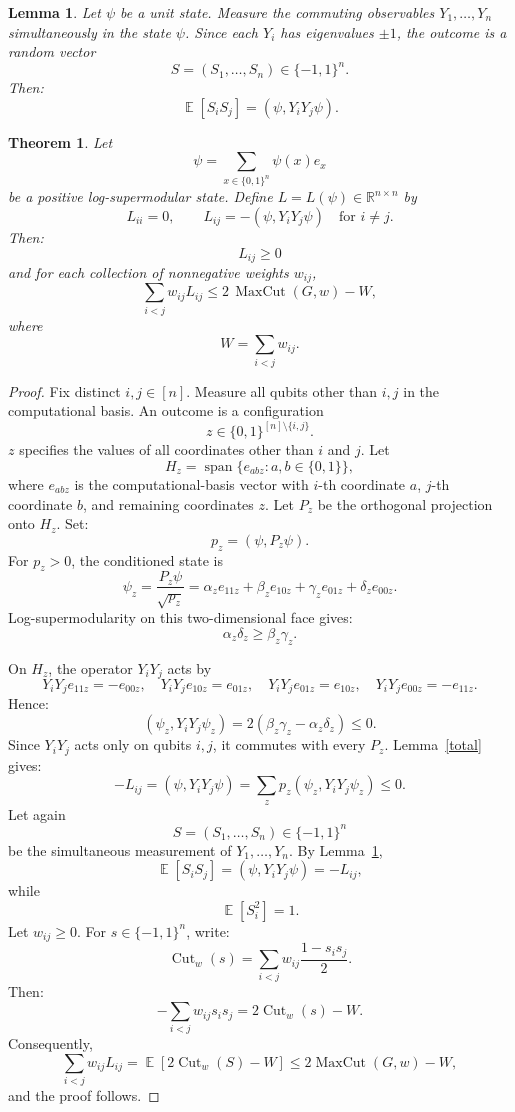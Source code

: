 \documentclass[10pt,a4paper]{amsart}
\newtheorem{lemma}{Lemma}
\newtheorem{theorem}{Theorem}
\DeclareMathOperator{\E}{\mathbb{E}}
\begin{document}
\begin{lemma}\label{joint}
Let \(\psi\) be a unit state. Measure the commuting observables \(Y_1,\ldots,Y_n\) simultaneously in the state \(\psi\). Since each \(Y_i\) has eigenvalues \(\pm1\), 
the outcome is a random vector
\[
S=(S_1,\ldots,S_n)\in\{-1,1\}^n.
\]
Then:
\[
\E[S_iS_j]
=
(\psi,Y_iY_j\psi).
\]
\end{lemma}

\begin{theorem}\label{thm:quantum}
Let
\[
\psi
=
\sum_{x\in\{0,1\}^n}
\psi(x)e_x
\]
be a positive log-supermodular state. Define \(L=L(\psi)\in\mathbb R^{n\times n}\) by
\[
L_{ii}=0,
\qquad
L_{ij}=-(\psi,Y_iY_j\psi)
\quad \text{for \(i \neq j\)}.
\]
Then:
\[
L_{ij} \ge 0
\]
and for each collection of nonnegative weights \(w_{ij}\),
\[
\sum_{i<j}w_{ij}L_{ij}
\le
2\,\operatorname{MaxCut}(G,w)-W,
\]
where
\[
W=\sum_{i<j}w_{ij}.
\]
\end{theorem}

\begin{proof}
Fix distinct \(i,j\in[n]\). 
Measure all qubits other than \(i,j\)
in the computational basis.
An outcome is a configuration
\[
z\in\{0,1\}^{[n]\setminus\{i,j\}}.
\]
\(z\) specifies the values of all coordinates
other than \(i\) and \(j\). Let
\[
H_z
=
\operatorname{span}\{e_{abz}:a,b\in\{0,1\}\},
\]
where \(e_{abz}\) is the computational-basis vector
with \(i\)-th coordinate \(a\),
\(j\)-th coordinate \(b\),
and remaining coordinates \(z\).
Let \(P_z\) be the orthogonal projection onto \(H_z\).
Set:
\[
p_z=(\psi,P_z\psi).
\]
For \(p_z>0\), the conditioned state is
\begin{equation}\label{psi_z}
\psi_z
=
\frac{P_z\psi}{\sqrt{p_z}}
=
\alpha_z e_{11z}
+\beta_z e_{10z}
+\gamma_z e_{01z}
+\delta_z e_{00z}.
\end{equation}
Log-supermodularity on this two-dimensional face gives:
\[
\alpha_z\delta_z
\ge
\beta_z\gamma_z.
\]
\smallskip%

On \(H_z\), the operator \(Y_iY_j\) acts by
\[
Y_iY_j e_{11z}=-e_{00z},
\quad
Y_iY_j e_{10z}=e_{01z},
\quad
Y_iY_j e_{01z}=e_{10z},
\quad
Y_iY_j e_{00z}=-e_{11z}.
\]
Hence:
\[
(\psi_z,Y_iY_j\psi_z)
=
2(\beta_z\gamma_z-\alpha_z\delta_z)
\le0.
\]
Since \(Y_iY_j\) acts only on qubits \(i,j\),
it commutes with every \(P_z\). Lemma~\ref{total} gives:
\[
-L_{ij}
=
(\psi,Y_iY_j\psi)
=
\sum_z
p_z(\psi_z,Y_iY_j\psi_z)
\le0.
\]
Let again
\[
S=(S_1,\ldots,S_n)\in\{-1,1\}^n
\]
be the simultaneous measurement of 
\(Y_1, \ldots, Y_n\). By Lemma~\ref{joint},
\[
\E[S_iS_j]
=
(\psi,Y_iY_j\psi)
=
-L_{ij},
\]
while
\[
\E[S_i^2]=1.
\]
Let \(w_{ij}\ge0\). For \(s\in\{-1,1\}^n\), write:
\[
\operatorname{Cut}_w(s)
=
\sum_{i<j}
w_{ij}\frac{1-s_is_j}{2}.
\]
Then:
\[
-\sum_{i<j}w_{ij}s_is_j
=
2\operatorname{Cut}_w(s)-W.
\]
Consequently,
\[
\sum_{i<j}w_{ij}L_{ij} = 
\E\!\left[
2\operatorname{Cut}_w(S)-W
\right] \le 2\operatorname{MaxCut}(G,w)-W,
\]
and the proof follows.
\end{proof}
\end{document}
